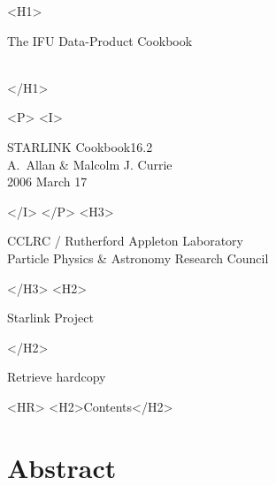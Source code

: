\documentclass[twoside,11pt]{article}
\newcommand{\stardoccategory}  {STARLINK Cookbook}
\newcommand{\stardocsource}    {sc\stardocnumber}
\newcommand{\stardocnumber}    {16.2}
\newcommand{\stardocauthors}   {A.~Allan \& Malcolm J. Currie}
\newcommand{\stardocdate}      {2006 March 17}
\newcommand{\stardoctitle}     {The IFU Data-Product Cookbook}
\newcommand{\htmladdnormallink}[2]{#1}
\newcommand{\htmladdimg}[1]{}
\newcommand{\htmlref}[2]{#1}
\newcommand{\htmladdtonavigation}[1]{}
\newcommand{\xlabel}[1]{}
\newcommand{\latexonlytoc}[0]{\tableofcontents}
\begin{document}
\begin{htmlonly}
   \xlabel{}
   \begin{rawhtml} <H1> \end{rawhtml}
      \stardoctitle\\
      \stardocversion\\
      \stardocmanual
   \begin{rawhtml} </H1> \end{rawhtml}

   \htmladdimg{sc16_cover.gif}


   \begin{rawhtml} <P> <I> \end{rawhtml}
   \stardoccategory \stardocnumber \\
   \stardocauthors \\
   \stardocdate
   \begin{rawhtml} </I> </P> <H3> \end{rawhtml}
      \htmladdnormallink{CCLRC}{http://www.cclrc.ac.uk} /
      \htmladdnormallink{Rutherford Appleton Laboratory}
                        {http://www.cclrc.ac.uk/ral} \\
      \htmladdnormallink{Particle Physics \& Astronomy Research Council}
                        {http://www.pparc.ac.uk} \\
   \begin{rawhtml} </H3> <H2> \end{rawhtml}
      \htmladdnormallink{Starlink Project}{http://star-www.rl.ac.uk/}
   \begin{rawhtml} </H2> \end{rawhtml}
   \htmladdnormallink{\htmladdimg{source.gif} Retrieve hardcopy}
      {http://star-www.rl.ac.uk/cgi-bin/hcserver?\stardocsource}\\

  \label{stardoccontents}
  \begin{rawhtml} 
    <HR>
    <H2>Contents</H2>
  \end{rawhtml}
  \renewcommand{\latexonlytoc}[0]{}

  \section{\xlabel{abstract}Abstract}
\end{htmlonly}
\end{document}
